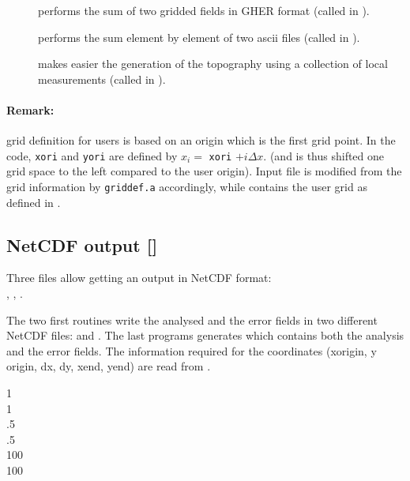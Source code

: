 \begin{description}
\item[] performs the sum of two gridded fields in GHER format (called in ).

\item[] performs the sum element by element of two ascii files (called in ).

\item[] makes easier the generation of the topography using a collection of local measurements (called in ).

\end{description}

\paragraph{Remark:} grid definition for users is based on an origin which is the first grid point. 
In the code, \texttt{xori} and \texttt{yori} are defined by $x_i=$ \texttt{xori} $+i \Delta x$.
(and is thus shifted one grid space to the left compared to the user origin). Input file  is modified from the  grid information by \texttt{griddef.a} accordingly, while  contains the user grid as defined in .


\subsection[NetCDF output]{NetCDF output []}


Three files allow getting an output in NetCDF format:\\ 
, , . 

The two first routines write the analysed and the error fields in two different NetCDF files:  and . The last programs generates  which contains both the analysis and the error fields. The information required for the coordinates (xorigin, y origin, dx, dy, xend, yend) are read from .

\begin{exfile}[H]
1\\
1\\
.5\\
 .5\\
100\\
100
\caption{}
\end{exfile}


